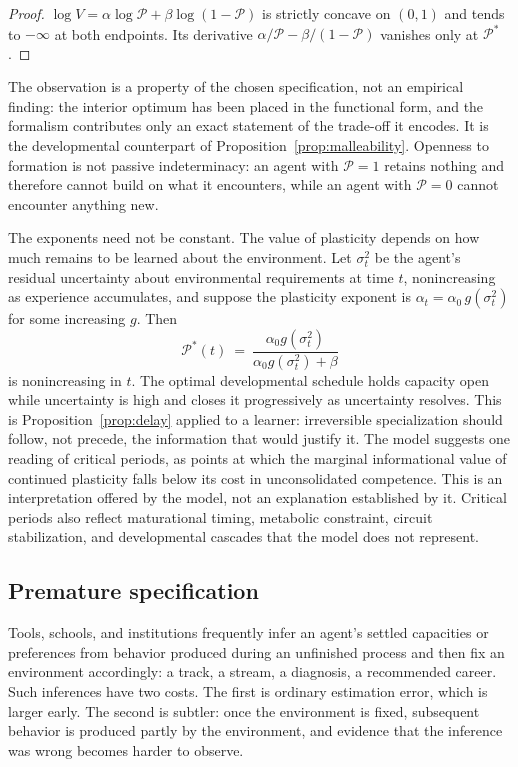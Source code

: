 \begin{proof}
$\log V=\alpha\log\mathcal{P}+\beta\log(1-\mathcal{P})$ is strictly concave on $(0,1)$ and tends to $-\infty$ at both endpoints. Its derivative $\alpha/\mathcal{P}-\beta/(1-\mathcal{P})$ vanishes only at $\mathcal{P}^\ast$.
\end{proof}

The observation is a property of the chosen specification, not an empirical finding: the interior optimum has been placed in the functional form, and the formalism contributes only an exact statement of the trade-off it encodes. It is the developmental counterpart of Proposition~\ref{prop:malleability}. Openness to formation is not passive indeterminacy: an agent with $\mathcal{P}=1$ retains nothing and therefore cannot build on what it encounters, while an agent with $\mathcal{P}=0$ cannot encounter anything new.

The exponents need not be constant. The value of plasticity depends on how much remains to be learned about the environment. Let $\sigma_t^2$ be the agent's residual uncertainty about environmental requirements at time $t$, nonincreasing as experience accumulates, and suppose the plasticity exponent is $\alpha_t=\alpha_0\,g(\sigma_t^2)$ for some increasing $g$. Then
\begin{equation}
\mathcal{P}^\ast(t)\ =\ \frac{\alpha_0 g(\sigma_t^2)}{\alpha_0 g(\sigma_t^2)+\beta}
\end{equation}
is nonincreasing in $t$. The optimal developmental schedule holds capacity open while uncertainty is high and closes it progressively as uncertainty resolves. This is Proposition~\ref{prop:delay} applied to a learner: irreversible specialization should follow, not precede, the information that would justify it. The model suggests one reading of critical periods, as points at which the marginal informational value of continued plasticity falls below its cost in unconsolidated competence. This is an interpretation offered by the model, not an explanation established by it. Critical periods also reflect maturational timing, metabolic constraint, circuit stabilization, and developmental cascades that the model does not represent.

\subsection{Premature specification}

Tools, schools, and institutions frequently infer an agent's settled capacities or preferences from behavior produced during an unfinished process and then fix an environment accordingly: a track, a stream, a diagnosis, a recommended career. Such inferences have two costs. The first is ordinary estimation error, which is larger early. The second is subtler: once the environment is fixed, subsequent behavior is produced partly by the environment, and evidence that the inference was wrong becomes harder to observe.

